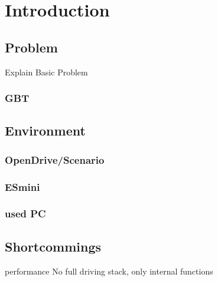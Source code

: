 \chapter{Introduction}
\section{Problem}
Explain Basic Problem

\subsection{GBT}

\section{Environment}
\subsection{OpenDrive/Scenario}
\subsection{ESmini}
\subsection{used PC}


\section{Shortcommings}
performance
No full driving stack, only internal functions